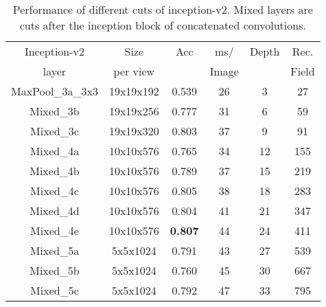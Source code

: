 \documentclass[conference]{IEEEtran}
\begin{document}
\begin{center}
\begin{table}[t]
  \caption{Performance of different cuts of inception-v2.
    Mixed layers are cuts after the inception block of concatenated
    convolutions.
    }
\label{tab:inception-v2-results}

\begin{tabular}{| c | c | c | c | c | c |}
\hline Inception-v2    & Size            & Acc    & ms/     & Depth & Rec. \\
              layer            & per view     &           & Image &           & Field  \\ \hline \hline
MaxPool\_3a\_3x3    & 19x19x192 & 0.539 & 26       & 3        & 27    \\ \hline
Mixed\_3b                 & 19x19x256 & 0.777 & 31       & 6        & 59    \\ \hline
Mixed\_3c                 & 19x19x320 & 0.803 & 37       & 9        & 91    \\ \hline
Mixed\_4a                 & 10x10x576 & 0.765 & 34       & 12      & 155   \\ \hline
Mixed\_4b                 & 10x10x576 & 0.789 & 37       & 15      & 219   \\ \hline
Mixed\_4c                 & 10x10x576 & 0.805 & 38       & 18      & 283   \\ \hline
Mixed\_4d                 & 10x10x576 & 0.804 & 41       & 21      & 347   \\ \hline
Mixed\_4e                 & 10x10x576 & \textbf{0.807} & 44 & 24 & 411   \\ \hline
Mixed\_5a                 & 5x5x1024   & 0.791 & 43       & 27      & 539   \\ \hline
Mixed\_5b                 & 5x5x1024   & 0.760 & 45       & 30      & 667   \\ \hline
Mixed\_5c                 & 5x5x1024   & 0.792 & 47       & 33      & 795   \\ \hline
\end{tabular}
\end{table}
\end{center}
\end{document}
